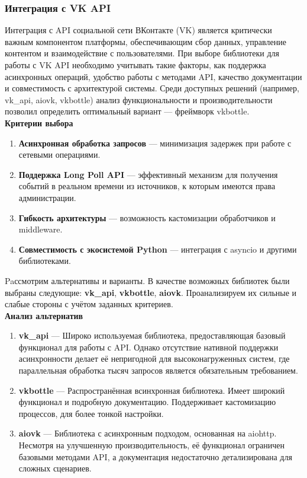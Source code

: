         \subsubsection{Интеграция с VK API}
            Интеграция с API социальной сети ВКонтакте (VK) является критически важным компонентом платформы, обеспечивающим сбор данных, управление контентом и взаимодействие с пользователями. При выборе библиотеки для работы с VK API необходимо учитывать такие факторы, как поддержка асинхронных операций, удобство работы с методами API, качество документации и совместимость с архитектурой системы. Среди доступных решений (например, vk\_api, aiovk, vkbottle) анализ функциональности и производительности позволил определить оптимальный вариант — фреймворк vkbottle. \\

            \textbf{Критерии выбора}
            \begin{enumerate}
                \item \textbf{Асинхронная обработка запросов} — минимизация задержек при работе с сетевыми операциями.
                \item \textbf{Поддержка Long Poll API} — эффективный механизм для получения событий в реальном времени из источников, к которым имеются права администрации.
                \item \textbf{Гибкость архитектуры} — возможность кастомизации обработчиков и middleware.
                \item \textbf{Совместимость с экосистемой Python} — интеграция с asyncio и другими библиотеками.
            \end{enumerate}

            Paссмотрим альтернативы и варианты. В качестве возможных библиотек были выбраны следующие: \textbf{vk\_api}, \textbf{vkbottle}, \textbf{aiovk}. Проанализируем их сильные и слабые стороны с учётом заданных критериев. \\

            \textbf{Анализ альтернатив}
            \begin{enumerate}
                \item \textbf{vk\_api} — Широко используемая библиотека, предоставляющая базовый функционал для работы с API. Однако отсутствие нативной поддержки асинхронности делает её непригодной для высоконагруженных систем, где параллельная обработка тысяч запросов является обязательным требованием.
                \item \textbf{vkbottle} — Распространённая всинхронная библиотека. Имеет широкий функционал и подробную документацию. Поддерживает кастомизацию процессов, для более тонкой настройки.
                \item \textbf{aiovk} — Библиотека с асинхронным подходом, основанная на aiohttp. Несмотря на улучшенную производительность, её функционал ограничен базовыми методами API, а документация недостаточно детализирована для сложных сценариев.
            \end{enumerate}
            
